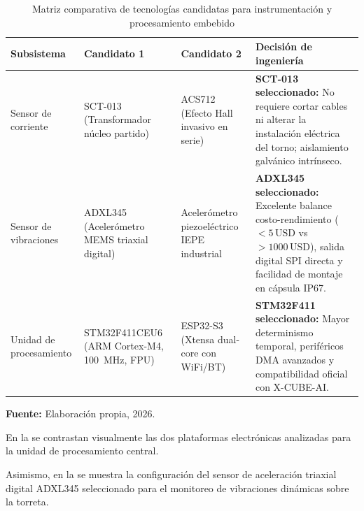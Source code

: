 \begin{table}[H]
\centering
\caption{Matriz comparativa de tecnologías candidatas para instrumentación y procesamiento embebido}\label{tab:comparativa_componentes}
\vspace{2mm}
\small\sloppy
\begin{tabular}{p{2.2cm}p{3.0cm}p{2.9cm}p{4.6cm}}
\hline
\textbf{Subsistema} & \textbf{Candidato 1} & \textbf{Candidato 2} & \textbf{Decisión de ingeniería} \\ \hline \hline
Sensor de corriente & SCT-013 (Transformador núcleo partido) & ACS712 (Efecto Hall invasivo en serie) & \textbf{SCT-013 seleccionado:} No requiere cortar cables ni alterar la instalación eléctrica del torno; aislamiento galvánico intrínseco. \\ \hline
Sensor de vibraciones & ADXL345 (Acelerómetro MEMS triaxial digital) & Acelerómetro piezoeléctrico IEPE industrial & \textbf{ADXL345 seleccionado:} Excelente balance costo-rendimiento ($< 5\,\text{USD}$ vs $> 1000\,\text{USD}$), salida digital SPI directa y facilidad de montaje en cápsula IP67. \\ \hline
Unidad de procesamiento & STM32F411CEU6 (ARM Cortex-M4, 100~MHz, FPU) & ESP32-S3 (Xtensa dual-core con WiFi/BT) & \textbf{STM32F411 seleccionado:} Mayor determinismo temporal, periféricos DMA avanzados y compatibilidad oficial con X-CUBE-AI. \\ \hline
\end{tabular}
\par\vspace{2mm}
\footnotesize \textbf{Fuente:} Elaboración propia, 2026.
\end{table}

En la  se contrastan visualmente las dos plataformas electrónicas analizadas para la unidad de procesamiento central.


Asimismo, en la  se muestra la configuración del sensor de aceleración triaxial digital ADXL345 seleccionado para el monitoreo de vibraciones dinámicas sobre la torreta.



